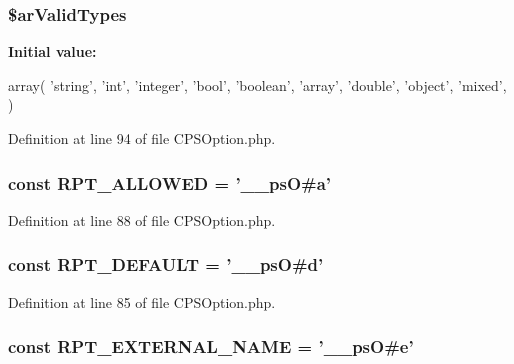 \hypertarget{classCPSOption_a5ec047f3082def78aa49930b7b56102b}{
\subsubsection[{\$arValidTypes}]{\setlength{\rightskip}{0pt plus 5cm}\$arValidTypes}}
\label{classCPSOption_a5ec047f3082def78aa49930b7b56102b}
{\bfseries Initial value:}
\begin{DoxyCode}
 array(
        'string',
        'int',
        'integer',
        'bool',
        'boolean',
        'array',
        'double',
        'object',
        'mixed',
    )
\end{DoxyCode}


Definition at line 94 of file CPSOption.php.

\hypertarget{classCPSOption_a15957bc41386cbb54751a774d2154721}{
\subsubsection[{RPT\_\-ALLOWED}]{\setlength{\rightskip}{0pt plus 5cm}const {\bf RPT\_\-ALLOWED} = '\_\-\_\-psO\#a'}}
\label{classCPSOption_a15957bc41386cbb54751a774d2154721}


Definition at line 88 of file CPSOption.php.

\hypertarget{classCPSOption_a269e636bbdcfa28179f931679d48643f}{
\subsubsection[{RPT\_\-DEFAULT}]{\setlength{\rightskip}{0pt plus 5cm}const {\bf RPT\_\-DEFAULT} = '\_\-\_\-psO\#d'}}
\label{classCPSOption_a269e636bbdcfa28179f931679d48643f}


Definition at line 85 of file CPSOption.php.

\hypertarget{classCPSOption_ac03762b40afa4745a976b2fd4b5cba8c}{
\subsubsection[{RPT\_\-EXTERNAL\_\-NAME}]{\setlength{\rightskip}{0pt plus 5cm}const {\bf RPT\_\-EXTERNAL\_\-NAME} = '\_\-\_\-psO\#e'}}
\label{classCPSOption_ac03762b40afa4745a976b2fd4b5cba8c}


